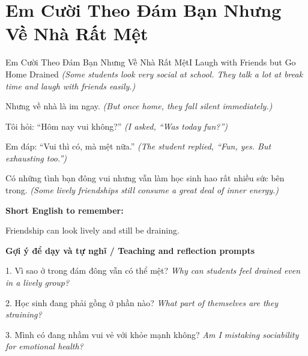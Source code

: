 \section{Em Cười Theo Đám Bạn Nhưng Về Nhà Rất Mệt}
\begin{truyen}{Em Cười Theo Đám Bạn Nhưng Về Nhà Rất Mệt}{I Laugh with Friends but Go Home Drained}
\textit{(Some students look very social at school. They talk a lot at break time and laugh with friends easily.)}

Nhưng về nhà là im ngay.
\textit{(But once home, they fall silent immediately.)}

Tôi hỏi: “Hôm nay vui không?”
\textit{(I asked, “Was today fun?”)}

Em đáp: “Vui thì có, mà mệt nữa.”
\textit{(The student replied, “Fun, yes. But exhausting too.”)}

\end{truyen}

\begin{baihoc}
Có những tình bạn đông vui nhưng vẫn làm học sinh hao rất nhiều sức bên trong.
\textit{(Some lively friendships still consume a great deal of inner energy.)}
\end{baihoc}

\begin{ghinhoanh}
\textbf{Short English to remember:}

Friendship can look lively and still be draining.

\end{ghinhoanh}

\begin{tuhocnhanh}
\textbf{Gợi ý để dạy và tự nghĩ / Teaching and reflection prompts}

1. Vì sao ở trong đám đông vẫn có thể mệt? \textit{Why can students feel drained even in a lively group?}

2. Học sinh đang phải gồng ở phần nào? \textit{What part of themselves are they straining?}

3. Mình có đang nhầm vui vẻ với khỏe mạnh không? \textit{Am I mistaking sociability for emotional health?}
\end{tuhocnhanh}
\ngancach


